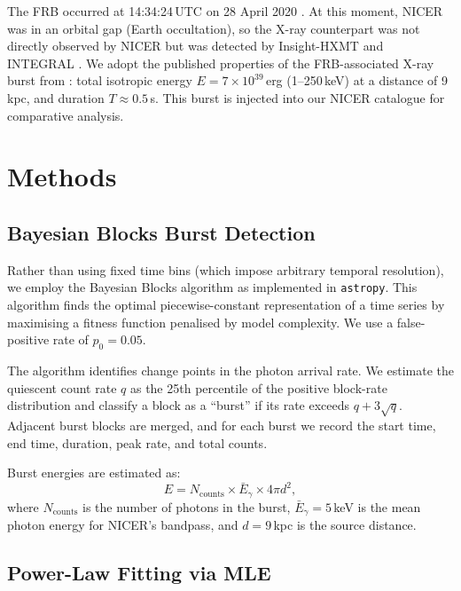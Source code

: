 \documentclass[12pt]{article}
\begin{document}
The FRB occurred at 14:34:24\,UTC on 28 April 2020
\citep{chime2020, bochenek2020}. At this moment, NICER was in an orbital
gap (Earth occultation), so the X-ray counterpart was not directly
observed by NICER but was detected by Insight-HXMT \citep{li2021} and
INTEGRAL \citep{mereghetti2020}. We adopt the published properties of the
FRB-associated X-ray burst from \citet{li2021}: total isotropic energy
$E = 7 \times 10^{39}$\,erg (1--250\,keV) at a distance of 9\,kpc, and
duration $T \approx 0.5$\,s. This burst is injected into our NICER
catalogue for comparative analysis.

\section{Methods}\label{sec:methods}

\subsection{Bayesian Blocks Burst Detection}

Rather than using fixed time bins (which impose arbitrary temporal
resolution), we employ the Bayesian Blocks algorithm
\citep{scargle1998, scargle2013} as implemented in \texttt{astropy}. This
algorithm finds the optimal piecewise-constant representation of a
time series by maximising a fitness function penalised by model complexity.
We use a false-positive rate of $p_0 = 0.05$.

The algorithm identifies change points in the photon arrival rate. We
estimate the quiescent count rate $q$ as the 25th percentile of the
positive block-rate distribution and classify a block as a ``burst'' if
its rate exceeds $q + 3\sqrt{q}$. Adjacent burst blocks are merged, and
for each burst we record the start time, end time, duration, peak rate,
and total counts.

Burst energies are estimated as:
\begin{equation}\label{eq:energy}
    E = N_{\mathrm{counts}} \times \bar{E}_\gamma \times 4\pi d^2,
\end{equation}
where $N_{\mathrm{counts}}$ is the number of photons in the burst,
$\bar{E}_\gamma = 5$\,keV is the mean photon energy for NICER's bandpass,
and $d = 9$\,kpc is the source distance.

\subsection{Power-Law Fitting via MLE}
\end{document}
